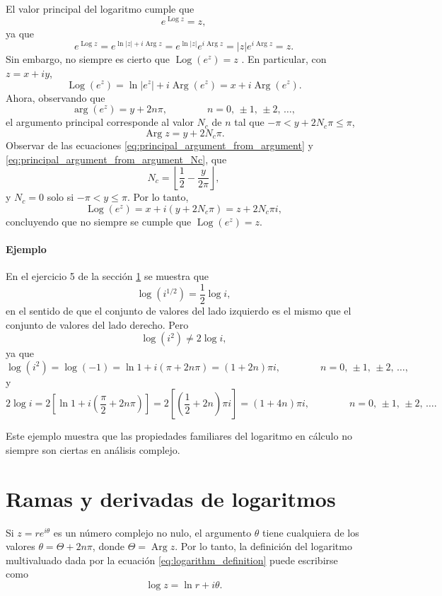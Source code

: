\documentclass[a4paper]{report}
\DeclareMathOperator{\Arg}{Arg}
\DeclareMathOperator{\Log}{Log}
\begin{document}
El valor principal del logaritmo cumple que
\[
 e^{\Log z}=z,
\]
ya que 
\[
 e^{\Log z}=e^{\ln|z|+i\Arg z}=e^{\ln|z|}e^{i\Arg z}=|z|e^{i\Arg z}=z.
\]
Sin embargo, no siempre es cierto que \(\Log(e^z)=z\) \cite{haber2019complex}. En particular, con \(z=x+iy\),
\[
 \Log(e^z)=\ln|e^z|+i\Arg(e^z)=x+i\Arg(e^z).
\]
Ahora, observando que 
\[
 \arg(e^z)=y+2n\pi,
 \qquad\qquad n=0,\,\pm1,\,\pm2,\,\dots, 
\]
el argumento principal corresponde al valor \(N_c\) de \(n\) tal que \(-\pi<y+2N_c\pi\leq\pi\),
\[
 \Arg z=y+2N_c\pi.
\]
Observar de las ecuaciones \ref{eq:principal_argument_from_argument} y \ref{eq:principal_argument_from_argument_Nc}, que 
\begin{equation}\label{eq:logarithm_pv_of_exponential_Nc}
 N_c=\left\lfloor\frac{1}{2}-\frac{y}{2\pi}\right\rfloor, 
\end{equation}
y \(N_c=0\) solo si \(-\pi<y\leq\pi\).
Por lo tanto,
\begin{equation}\label{eq:logarithm_pv_of_exponential}
 \Log(e^z)=x+i(y+2N_c\pi)=z+2N_c\pi i,
\end{equation}
concluyendo que no siempre se cumple que \(\Log(e^z)=z\).

\paragraph{Ejemplo} En el ejercicio 5 de la sección \ref{sec:logarithm_branches} se muestra que 
\[
 \log(i^{1/2})=\frac{1}{2}\log i,
\]
en el sentido de que el conjunto de valores del lado izquierdo es el mismo que el conjunto de valores del lado derecho. Pero
\[
 \log(i^2)\neq2\log i,
\]
ya que
\[
 \log(i^2)=\log(-1)=\ln1+i(\pi+2n\pi)=(1+2n)\pi i,\qquad\qquad n=0,\,\pm1,\,\pm2,\,\dots,
\]
y
\[
 2\log i=2\left[\ln1+i\left(\frac{\pi}{2}+2n\pi\right)\right]=2\left[\left(\frac{1}{2}+2n\right)\pi i\right]=(1+4n)\pi i,\qquad\qquad n=0,\,\pm1,\,\pm2,\,\dots.
\]

Este ejemplo muestra que las propiedades familiares del logaritmo en cálculo no siempre son ciertas en análisis complejo.

\section{Ramas y derivadas de logaritmos}\label{sec:logarithm_branches}

Si \(z=re^{i\theta}\) es un número complejo no nulo, el argumento \(\theta\) tiene cualquiera de los valores \(\theta=\Theta+2n\pi\), donde \(\Theta=\Arg z\). Por lo tanto, la definición del logaritmo multivaluado dada por la ecuación \ref{eq:logarithm_definition} puede escribirse como
\begin{equation}\label{eq:logarithm_definition_theta}
 \log z=\ln r+i\theta. 
\end{equation}
\end{document}
